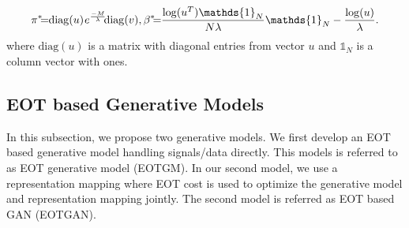 \begin{equation}\label{eq-dual-opt}
  \hspace{-1pt}\pi^{\ast}\hspace{-5pt} =\hspace{-3pt}
  \mathrm{diag}(u) \,\hspace{-1pt} e^{\frac{-M}{\la}} \, \hspace{-4pt}\mathrm{diag}(v),  \beta^{\ast}\hspace{-5pt} =\hspace{-3pt}\frac{\log(u^T)\mathds{1}_N}{N\la} \mathds{1}_N -\frac{\log(u)}{\la}.\vspace{-2pt}
\end{equation}
where $\mathrm{diag}(u)$ is a matrix with diagonal entries from vector $u$ and $\mathds{1}_N$ is a column vector with ones.


\subsection{EOT based Generative Models}

In this subsection, we propose two generative models.
We first develop an EOT based generative model handling signals/data directly. This models is referred to as EOT generative model (EOTGM). 
In our second model, we use a
representation mapping where EOT cost is used to optimize the
generative model and representation mapping jointly. The second model is referred as EOT based GAN (EOTGAN).
\vspace{-3pt}
